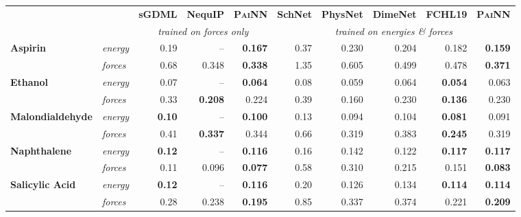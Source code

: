 \documentclass[reprint,
amsmath,amssymb,
 aip,jcp
]{revtex4-2}
\newcommand{\painn}{\textsc{PaiNN}}
\begin{document}
\begin{table*}[tb]
\caption{Mean absolute errors on MD17 dataset for energy and force predictions in kcal/mol and kcal/mol/{\AA}, respectively. \citet{batzner2021se} only reported force errors for \textsc{NequIP}. Results for \painn{} are averaged over three random splits. Best in \textbf{bold}.}
\label{tab:md17}
\begin{center}
\begin{scriptsize}
\begin{sc}
\begin{tabular}{llrrr|rrrrr}
\toprule
& & \textbf{sGDML} & \textbf{NequIP} & \textbf{\painn{}} & \textbf{SchNet} & \textbf{PhysNet} & \textbf{DimeNet} & \textbf{FCHL19} & \textbf{\painn{}} \\ 
& &  \multicolumn{3}{c}{\textit{trained on forces only}} & \multicolumn{5}{c}{\textit{trained on energies \& forces}} \\
\midrule

\multirow{2}{*}{\textbf{Aspirin}} & \textit{energy} & 0.19 & -- & \textbf{0.167} &  0.37 & 0.230 & 0.204 & 0.182 & \textbf{0.159} \\
 & \textit{forces} & 0.68 & 0.348 & \textbf{0.338} & 1.35 & 0.605 & 0.499 & 0.478 & \textbf{0.371} \\ \midrule
 
 \multirow{2}{*}{\textbf{Ethanol}} & \textit{energy} & 0.07 & -- & \textbf{0.064} & 0.08  & 0.059 & 0.064 & \textbf{0.054} & 0.063 \\
 & \textit{forces} & 0.33 & \textbf{0.208} & 0.224 & 0.39 & 0.160 & 0.230 & \textbf{0.136} & 0.230 \\ 
 \midrule
 
 \multirow{2}{*}{\textbf{Malondialdehyde}} & \textit{energy} & \textbf{0.10} & -- & \textbf{0.100}  &  0.13  & 0.094 & 0.104 & \textbf{0.081} & 0.091 \\
 & \textit{forces} & 0.41 & \textbf{0.337} & 0.344 & 0.66 & 0.319 & 0.383 & \textbf{0.245} & 0.319 \\ 
 \midrule
 
 \multirow{2}{*}{\textbf{Naphthalene}} & \textit{energy} & \textbf{0.12} & -- & \textbf{0.116} & 0.16 & 0.142 & 0.122 & \textbf{0.117} & \textbf{0.117} \\
 & \textit{forces} & 0.11 & 0.096 & \textbf{0.077} & 0.58 & 0.310 & 0.215 &  0.151 & \textbf{0.083} \\ 
 \midrule
 
 \multirow{2}{*}{\textbf{Salicylic Acid}} & \textit{energy} & \textbf{0.12} & -- & \textbf{0.116} & 0.20 & 0.126 & 0.134 & \textbf{0.114} & \textbf{0.114} \\
 & \textit{forces} & 0.28 & 0.238 & \textbf{0.195} & 0.85 & 0.337 & 0.374 & 0.221 &  \textbf{0.209} \\ 
 \midrule
 

\end{tabular}
\end{sc}
\end{scriptsize}
\end{center}
\end{table*}
\end{document}

